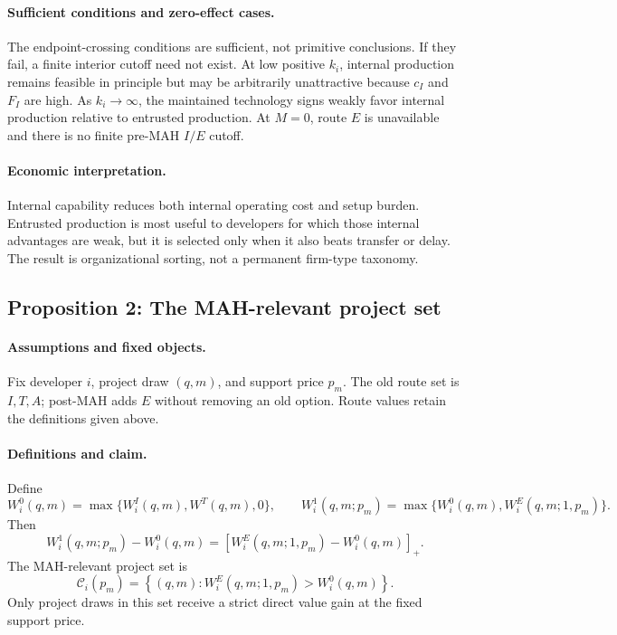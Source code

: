 \paragraph{Sufficient conditions and zero-effect cases.}
The endpoint-crossing conditions are sufficient, not primitive conclusions.
If they fail, a finite interior cutoff need not exist. At low positive
\(k_i\), internal production remains feasible in principle but may be
arbitrarily unattractive because \(c_I\) and \(F_I\) are high. As
\(k_i\rightarrow\infty\), the maintained technology signs weakly favor
internal production relative to entrusted production. At \(M=0\), route \(E\)
is unavailable and there is no finite pre-MAH \(I/E\) cutoff.

\paragraph{Economic interpretation.}
Internal capability reduces both internal operating cost and setup burden.
Entrusted production is most useful to developers for which those internal
advantages are weak, but it is selected only when it also beats transfer or
delay. The result is organizational sorting, not a permanent firm-type
taxonomy.

\subsection{Proposition 2: The MAH-relevant project set}
\label{prop:p08-relevant-set}

\paragraph{Assumptions and fixed objects.}
Fix developer \(i\), project draw \((q,m)\), and support price \(p_m\).
The old route set is \(I,T,A\); post-MAH adds \(E\) without removing an old
option. Route values retain the definitions given above.

\paragraph{Definitions and claim.}
Define
\begin{equation}
  W_i^0(q,m)
  =
  \max\{W_i^I(q,m),W^T(q,m),0\},
  \qquad
  W_i^1(q,m;p_m)
  =
  \max\{W_i^0(q,m),W_i^E(q,m;1,p_m)\}.
  \label{eq:p08-old-new-values}
\end{equation}
Then
\begin{equation}
  W_i^1(q,m;p_m)-W_i^0(q,m)
  =
  \left[W_i^E(q,m;1,p_m)-W_i^0(q,m)\right]_+.
  \label{eq:p08-positive-part-gain}
\end{equation}
The MAH-relevant project set is
\begin{equation}
  \mathcal C_i(p_m)
  =
  \left\{(q,m):
  W_i^E(q,m;1,p_m)>W_i^0(q,m)\right\}.
  \label{eq:p08-relevant-set}
\end{equation}
Only project draws in this set receive a strict direct value gain at the fixed
support price.

